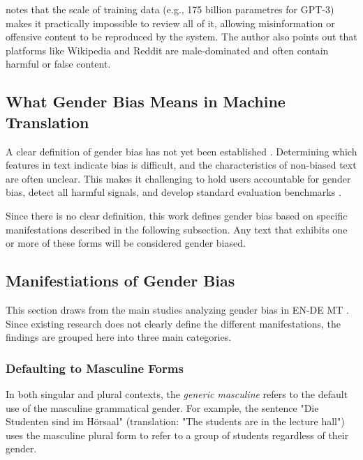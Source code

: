 \citet{ullmannGenderBiasMachine2022} notes that the scale of training data (e.g., 175 billion parametres for GPT-3) makes it practically impossible to review all of it, allowing misinformation or offensive content to be reproduced by the system. The author also points out that platforms like Wikipedia and Reddit are male-dominated and often contain harmful or false content.

\subsection{What Gender Bias Means in Machine Translation}\label{subsection:what_is_gb}

A clear definition of gender bias has not yet been established \citep{stanczakSurveyGenderBias2021}. Determining which features in text indicate bias is difficult, and the characteristics of non-biased text are often unclear. This makes it challenging to hold users accountable for gender bias, detect all harmful signals, and develop standard evaluation benchmarks \citep{barclayInvestigatingMarkersDrivers2024a,shresthaExploringGenderBiases2022,stanczakSurveyGenderBias2021}. 

Since there is no clear definition, this work defines gender bias based on specific manifestations described in the following subsection. Any text that exhibits one or more of these forms will be considered gender biased.

\subsection{Manifestiations of Gender Bias}
This section draws from the main studies analyzing gender bias in EN-DE MT \citep{ullmannGenderBiasMachine2022,rescignoGenderBiasMachine2023,lardelliBuildingBridgesDataset2024,kapplAreAllSpanish2025}. Since existing research does not clearly define the different manifestations, the findings are grouped here into three main categories.

\subsubsection{Defaulting to Masculine Forms}
In both singular and plural contexts, the \textit{generic masculine} refers to the default use of the masculine grammatical gender.
For example, the sentence "Die Studenten sind im Hörsaal" (translation: "The students are in the lecture hall") uses the masculine plural form to refer to a group of students regardless of their gender.

